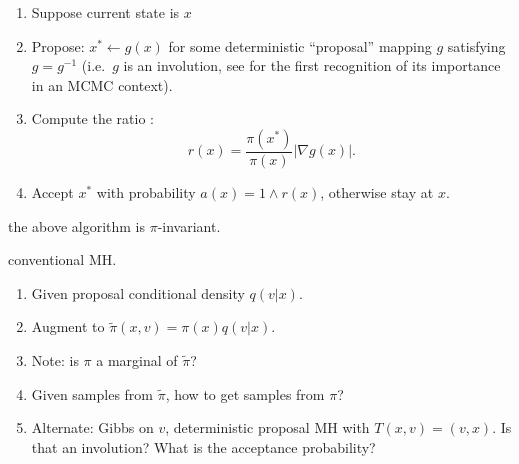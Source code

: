 \documentclass{article}
\begin{document}
 \begin{enumerate}
	\item Suppose current state is $x$
	\item Propose: $x^* \gets g(x)$ for some deterministic ``proposal'' mapping $g$ satisfying $g = g^{-1}$ (i.e.\ $g$ is an involution, see  \cite{tierney_note_1998} for the first recognition of its importance in an MCMC context). 
	\item Compute the ratio \citep{geyer_simulation_1994,green_reversible_1995}:
	\[ r(x) = \frac{\pi(x^*)}{\pi(x)} |\nabla g(x)|.  \]
	\item Accept $x^*$ with probability $a(x) = 1 \wedge r(x)$, otherwise stay at $x$.
\end{enumerate}  

 the above algorithm is $\pi$-invariant.

 conventional MH. 
\begin{enumerate}
	\item Given proposal conditional density $q(v | x)$. 
	\item  Augment to $\tilde \pi(x, v) = \pi(x) q(v | x)$. 
	\item Note: is $\pi$ a marginal of $\tilde \pi$? 
	\item Given samples from $\tilde \pi$, how to get samples from $\pi$? 
	\item Alternate: Gibbs on $v$, deterministic proposal MH with $T(x, v) = (v, x)$. Is that an involution? What is the acceptance probability?
\end{enumerate}
\end{document}
